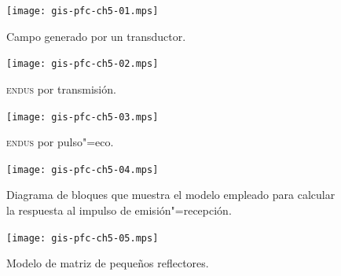 \documentclass[a4paper,12pt]				{article}
\begin{document}
\clearpage

\begin{figure}
	\begin{center}
		\texttt{[image: gis-pfc-ch5-01.mps]}
	\end{center}
	\caption[Campo generado por un transductor]{Campo generado por un
	transductor.}
	\label{fig:field}
\end{figure}

\begin{figure}
	\begin{center}
		\texttt{[image: gis-pfc-ch5-02.mps]}
	\end{center}
	\caption[\textsc{endus} por transmisión]{\textsc{endus} por
	transmisión.}
	\label{fig:transmission}
\end{figure}

\begin{figure}
	\begin{center}
		\texttt{[image: gis-pfc-ch5-03.mps]}
	\end{center}
	\caption[\textsc{endus} por pulso"=eco]{\textsc{endus} por
	pulso"=eco.}
	\label{fig:echo}
\end{figure}

\begin{figure}
	\begin{center}
		\texttt{[image: gis-pfc-ch5-04.mps]}
	\end{center}
	\caption[Modelo de emisión"=transmisión]{Diagrama de bloques que
	muestra el modelo empleado para calcular la respuesta al impulso de
	emisión"=recepción.}
	\label{fig:model}
\end{figure}

\clearpage

\begin{figure}
	\begin{center}
		\texttt{[image: gis-pfc-ch5-05.mps]}
	\end{center}
	\caption[Modelo de matriz de pequeños reflectores]{Modelo de matriz
	de pequeños reflectores.}
	\label{fig:matrix}
\end{figure}
\end{document}
